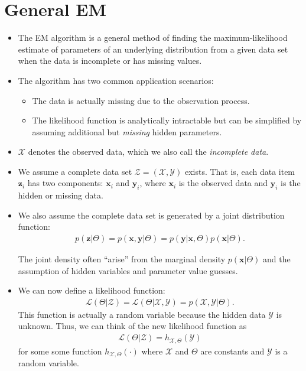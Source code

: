 \documentclass[10pt]{article}
\newcommand{\likelihood}{\mathcal{L}}
\newcommand{\X}{\mathcal{X}}
\newcommand{\Y}{\mathcal{Y}}
\newcommand{\Z}{\mathcal{Z}}
\newcommand{\x}{\mathbf{x}}
\newcommand{\y}{\mathbf{y}}
\newcommand{\z}{\mathbf{z}}
\begin{document}
  \section{General EM}
  \begin{itemize}
    \item The EM algorithm is a general method of finding the maximum-likelihood estimate of parameters of an underlying distribution from a given data set when the data is incomplete or has missing values.
    
    \item The algorithm has two common application scenarios:
    \begin{itemize}
      \item The data is actually missing due to the observation process.
      \item The likelihood function is analytically intractable but can be simplified by assuming additional but \emph{missing} hidden parameters.
    \end{itemize}
    
    \item $\X$ denotes the observed data, which we also call the \emph{incomplete data}.
    
    \item We assume a complete data set $\Z = (\X, \Y)$ exists. That is, each data item $\z_i$ has two components: $\x_i$ and $\y_i$, where $\x_i$ is the observed data and $\y_i$ is the hidden or missing data. 
    
    \item We also assume the complete data set is generated by a joint distribution function:
    \begin{align*}
      p(\z | \Theta) = p(\x, \y | \Theta) = p(\y|\x, \Theta) p(\x|\Theta).
    \end{align*}
    
    The joint density often ``arise'' from the marginal density $p(\x|\Theta)$ and the assumption of hidden variables and parameter value guesses.
    
    \item We can now define a likelihood function:
    \begin{align*}
      \likelihood(\Theta|\Z) = \likelihood(\Theta|\X,\Y) = p(\X,\Y|\Theta).
    \end{align*}
    This function is actually a random variable because the hidden data $\Y$ is unknown. Thus, we can think of the new likelihood function as
    \begin{align*}
      \likelihood(\Theta|\Z) = h_{\X,\Theta}(\Y)
    \end{align*}
    for some some function $h_{\X, \Theta}(\cdot)$ where $\X$ and $\Theta$ are constants and $\Y$ is a random variable.
    

\end{itemize}
\end{document}
